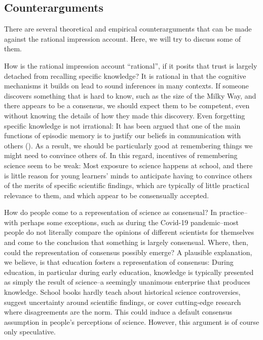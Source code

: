 \documentclass[
  jou,
  floatsintext,
  longtable,
  nolmodern,
  notxfonts,
  notimes,
  colorlinks=true,linkcolor=blue,citecolor=blue,urlcolor=blue]{apa7}
\begin{document}
\subsection{Counterarguments}\label{counterarguments}

There are several theoretical and empirical counterarguments that can be
made against the rational impression account. Here, we will try to
discuss some of them.

How is the rational impression account ``rational'', if it posits that
trust is largely detached from recalling specific knowledge? It is
rational in that the cognitive mechanisms it builds on lead to sound
inferences in many contexts. If someone discovers something that is hard
to know, such as the size of the Milky Way, and there appears to be a
consensus, we should expect them to be competent, even without knowing
the details of how they made this discovery. Even forgetting specific
knowledge is not irrational: It has been argued that one of the main
functions of episodic memory is to justify our beliefs in communication
with others (). As a result, we should be particularly good at remembering
things we might need to convince others of. In this regard, incentives
of remembering science seem to be weak: Most exposure to science happens
at school, and there is little reason for young learners' minds to
anticipate having to convince others of the merits of specific
scientific findings, which are typically of little practical relevance
to them, and which appear to be consensually accepted.

How do people come to a representation of science as consensual? In
practice--with perhaps some exceptions, such as during the Covid-19
pandemic--most people do not literally compare the opinions of different
scientists for themselves and come to the conclusion that something is
largely consensual. Where, then, could the representation of consensus
possibly emerge? A plausible explanation, we believe, is that education
fosters a representation of consensus: During education, in particular
during early education, knowledge is typically presented as simply the
result of science--a seemingly unanimous enterprise that produces
knowledge. School books hardly teach about historical science
controversies, suggest uncertainty around scientific findings, or cover
cutting-edge research where disagreements are the norm. This could
induce a default consensus assumption in people's perceptions of
science. However, this argument is of course only speculative.
\end{document}
